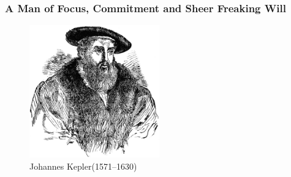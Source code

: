 \begin{frame}
\frametitle{A Man of Focus, Commitment and Sheer Freaking Will}
\begin{figure}[!htbp]
\centering
\includegraphics[width=0.5\textwidth]{./data/image/kepler.png}
\caption{Johannes Kepler(1571--1630)}
\label{image:kepler}
\end{figure}
\end{frame}
  
